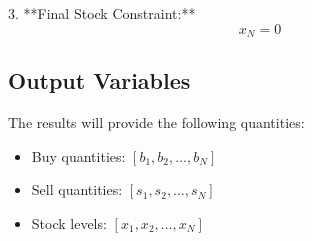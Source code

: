 \documentclass{article}
\begin{document}
3. **Final Stock Constraint:**
   \[
   x_N = 0
   \]

\subsection*{Output Variables}
The results will provide the following quantities:
\begin{itemize}
    \item Buy quantities: \( [b_1, b_2, \ldots, b_N] \)
    \item Sell quantities: \( [s_1, s_2, \ldots, s_N] \)
    \item Stock levels: \( [x_1, x_2, \ldots, x_N] \)
\end{itemize}
\end{document}
